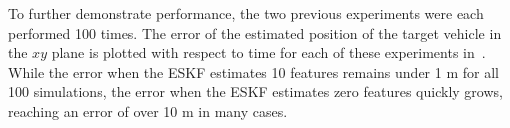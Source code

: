 

To further demonstrate performance, the two previous experiments were each performed 100
times.
The error of the estimated position of the target vehicle in the $xy$ plane is
plotted with respect to time for each of these experiments
in~. While the error when the ESKF estimates 10 features
remains under 1 m for all 100 simulations, the error when the ESKF estimates
zero features quickly grows, reaching an error of over 10 m in many cases.

